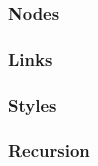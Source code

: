 \subsubsection{Nodes}


\subsubsection{Links}


\subsubsection{Styles}


\subsubsection{Recursion}

